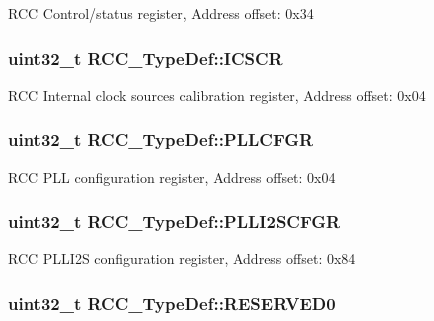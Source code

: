 R\-C\-C Control/status register, Address offset\-: 0x34 \hypertarget{struct_r_c_c___type_def_a5aa77c68f2409fff241e949f3d6129b5}{
\subsubsection[{I\-C\-S\-C\-R}]{ uint32\-\_\-t R\-C\-C\-\_\-\-Type\-Def\-::\-I\-C\-S\-C\-R}}\label{struct_r_c_c___type_def_a5aa77c68f2409fff241e949f3d6129b5}
R\-C\-C Internal clock sources calibration register, Address offset\-: 0x04 \hypertarget{struct_r_c_c___type_def_a2a7ccb4e23cb05a574f243f6278b7b26}{
\subsubsection[{P\-L\-L\-C\-F\-G\-R}]{ uint32\-\_\-t R\-C\-C\-\_\-\-Type\-Def\-::\-P\-L\-L\-C\-F\-G\-R}}\label{struct_r_c_c___type_def_a2a7ccb4e23cb05a574f243f6278b7b26}
R\-C\-C P\-L\-L configuration register, Address offset\-: 0x04 \hypertarget{struct_r_c_c___type_def_ac3beb02dccd9131d6ce55bb29c5fa69f}{
\subsubsection[{P\-L\-L\-I2\-S\-C\-F\-G\-R}]{ uint32\-\_\-t R\-C\-C\-\_\-\-Type\-Def\-::\-P\-L\-L\-I2\-S\-C\-F\-G\-R}}\label{struct_r_c_c___type_def_ac3beb02dccd9131d6ce55bb29c5fa69f}
R\-C\-C P\-L\-L\-I2\-S configuration register, Address offset\-: 0x84 \hypertarget{struct_r_c_c___type_def_a646631532167f3386763a2d10a881a04}{
\subsubsection[{R\-E\-S\-E\-R\-V\-E\-D0}]{\setlength{\rightskip}{0pt plus 5cm}uint32\-\_\-t R\-C\-C\-\_\-\-Type\-Def\-::\-R\-E\-S\-E\-R\-V\-E\-D0}}\label{struct_r_c_c___type_def_a646631532167f3386763a2d10a881a04}
